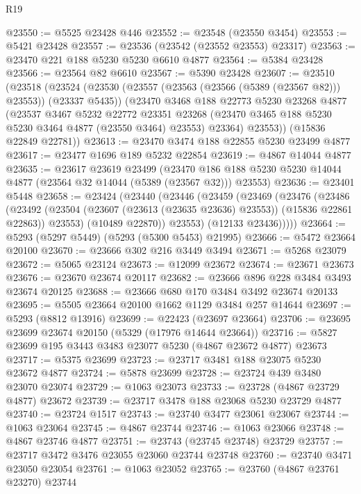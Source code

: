 \begin{lexlean}{R19}
\begin{coremodule}
@23550 := @5525 @23428 @446
@23552 := @23548 (@23550 @3454)
@23553 := @5421 @23428
@23557 := @23536 (@23542 (@23552 @23553) @23317)
@23563 := @23470 @221 @188 @5230 @5230 @6610 @4877
@23564 := @5384 @23428
@23566 := @23564 @82 @6610
@23567 := @5390 @23428
@23607 := @23510
    (@23518
      (@23524
        (@23530 (@23557 (@23563 (@23566 (@5389 (@23567 @82))) @23553)) (@23337 @5435))
        (@23470
          @3468
          @188
          @22773
          @5230
          @23268
          @4877
          (@23537
            @3467
            @5232
            @22772
            @23351
            @23268
            (@23470 @3465 @188 @5230 @5230 @3464 @4877 (@23550 @3464) @23553)
            @23364)
          @23553))
      (@15836 @22849 @22781))
@23613 := @23470 @3474 @188 @22855 @5230 @23499 @4877
@23617 := @23477 @1696 @189 @5232 @22854
@23619 := @4867 @14044 @4877
@23635 := @23617
    @23619
    @23499
    (@23470 @186 @188 @5230 @5230 @14044 @4877 (@23564 @32 @14044 (@5389 (@23567 @32))) @23553)
@23636 := @23401 @5448
@23658 := @23424
    (@23440
      (@23446
        (@23459
          (@23469
            (@23476
              (@23486
                (@23492
                  (@23504 (@23607 (@23613 (@23635 @23636) @23553)) (@15836 @22861 @22863))
                  @23553)
                (@10489 @22870))
              @23553)
            (@12133 @23436)))))
@23664 := @5293 (@5297 @5449) (@5293 (@5300 @5453) @21995)
@23666 := @5472 @23664 @20100
@23670 := @23666 @302 @216 @3449 @3494
@23671 := @5268 @23079
@23672 := @5065 @23124
@23673 := @12099 @23672
@23674 := @23671 @23673
@23676 := @23670 @23674 @20117
@23682 := @23666 @896 @228 @3484 @3493 @23674 @20125
@23688 := @23666 @680 @170 @3484 @3492 @23674 @20133
@23695 := @5505 @23664 @20100 @1662 @1129 @3484 @257 @14644
@23697 := @5293 (@8812 @13916)
@23699 := @22423 (@23697 @23664)
@23706 := @23695 @23699 @23674 @20150 (@5329 (@17976 @14644 @23664))
@23716 := @5827 @23699 @195 @3443 @3483 @23077 @5230 (@4867 @23672 @4877) @23673
@23717 := @5375 @23699
@23723 := @23717 @3481 @188 @23075 @5230 @23672 @4877
@23724 := @5878 @23699
@23728 := @23724 @439 @3480 @23070 @23074
@23729 := @1063 @23073
@23733 := @23728 (@4867 @23729 @4877) @23672
@23739 := @23717 @3478 @188 @23068 @5230 @23729 @4877
@23740 := @23724 @1517
@23743 := @23740 @3477 @23061 @23067
@23744 := @1063 @23064
@23745 := @4867 @23744
@23746 := @1063 @23066
@23748 := @4867 @23746 @4877
@23751 := @23743 (@23745 @23748) @23729
@23757 := @23717 @3472 @3476 @23055 @23060 @23744 @23748
@23760 := @23740 @3471 @23050 @23054
@23761 := @1063 @23052
@23765 := @23760 (@4867 @23761 @23270) @23744

\end{coremodule}
\end{lexlean}
